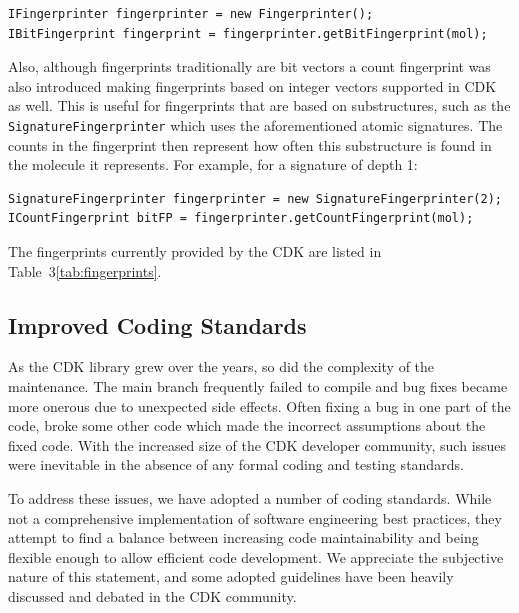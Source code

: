 \documentclass[10pt]{bmcart}
\begin{document}
\vspace{0.2cm}
\begin{verbatim}
IFingerprinter fingerprinter = new Fingerprinter();
IBitFingerprint fingerprint = fingerprinter.getBitFingerprint(mol);
\end{verbatim}
\vspace{0.2cm}

Also, although fingerprints traditionally are bit vectors a count
fingerprint was also introduced making fingerprints based on integer
vectors supported in CDK as well. This is useful for fingerprints that are based
on substructures, such as the \texttt{SignatureFingerprinter} which uses the
aforementioned atomic signatures. The counts in the fingerprint then represent
how often this substructure is found in the molecule it represents. For
example, for a signature of depth 1:

\vspace{0.2cm}
\begin{verbatim}
SignatureFingerprinter fingerprinter = new SignatureFingerprinter(2);
ICountFingerprint bitFP = fingerprinter.getCountFingerprint(mol);
\end{verbatim}
\vspace{0.2cm}

The fingerprints currently provided by the CDK are listed in Table~3\ref{tab:fingerprints}.



\subsection*{Improved Coding Standards}

As the CDK library grew over the years, so did the complexity of the
maintenance. The main branch frequently failed to compile and bug
fixes became more onerous due to unexpected side effects.  Often
fixing a bug in one part of the code, broke some other code which made
the incorrect assumptions about the fixed code. With the increased size of
the CDK developer community, such issues were inevitable in the
absence of any formal coding and testing standards.

To address these issues, we have adopted a number of coding
standards. While not a comprehensive implementation of software
engineering best practices, they attempt to find a balance between
increasing code maintainability and being flexible enough to allow
efficient code development. We appreciate the subjective
nature of this statement, and some adopted guidelines have been
heavily discussed and debated in the CDK community.
\end{document}
